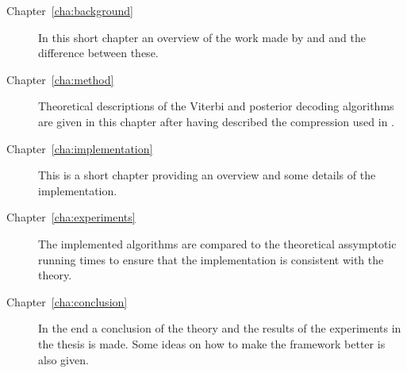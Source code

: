 \begin{description}
\item[Chapter~\ref{cha:background}] In this short chapter an overview of
  the work made by \citet{lifshits2009speeding} and \citet{sand2013ziphmmlib}
  and the difference between these.
\item[Chapter~\ref{cha:method}] Theoretical descriptions of the Viterbi and
  posterior decoding algorithms are given in this chapter after having
  described the compression used in \citet{sand2013ziphmmlib}.
\item[Chapter~\ref{cha:implementation}] This is a short chapter providing an
  overview and some details of the implementation.
\item[Chapter~\ref{cha:experiments}] The implemented algorithms are compared to
  the theoretical assymptotic running times to ensure that the implementation
  is consistent with the theory.
\item[Chapter~\ref{cha:conclusion}] In the end a conclusion of the theory and
  the results of the experiments in the thesis is made. Some ideas on how to
  make the framework better is also given.
\end{description}

